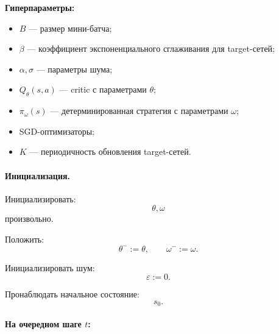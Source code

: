 \documentclass[12pt,a4paper]{article}
\begin{document}
\textbf{Гиперпараметры:}

\begin{itemize}
    \item $B$ --- размер мини-батча;
    \item $\beta$ --- коэффициент экспоненциального сглаживания для target-сетей;
    \item $\alpha,\sigma$ --- параметры шума;
    \item $Q_\theta(s,a)$ --- critic с параметрами $\theta$;
    \item $\pi_\omega(s)$ --- детерминированная стратегия с параметрами $\omega$;
    \item SGD-оптимизаторы;
    \item $K$ --- периодичность обновления target-сетей.
\end{itemize}

\paragraph{Инициализация.}

Инициализировать:
\[
\theta,\omega
\]
произвольно.

Положить:
\[
\theta^-:=\theta,
\qquad
\omega^-:=\omega.
\]

Инициализировать шум:
\[
\varepsilon:=0.
\]

Пронаблюдать начальное состояние:
\[
s_0.
\]

\paragraph{На очередном шаге $t$:}
\end{document}
